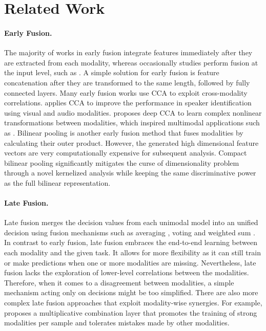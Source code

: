 \documentclass[10pt,twocolumn,letterpaper]{article}
\begin{document}
\section{Related Work}
\paragraph{Early Fusion.}
The majority of works in early fusion integrate features immediately after they are extracted from each modality, whereas occasionally studies perform fusion at the input level, such as \cite{Morales2016DeepCA}. A simple solution for early fusion is feature concatenation after they are transformed to the same length, followed by fully connected layers. Many early fusion works use CCA to exploit cross-modality correlations. \cite{sargin2006multimodal} applies CCA to improve the performance in speaker identification using visual and audio modalities. \cite{andrew2013deep} proposes deep CCA to learn complex nonlinear transformations between modalities, which inspired multimodal applications such as \cite{liu2019multimodal}. Bilinear pooling is another early fusion method that fuses modalities by calculating their outer product. However, the generated high dimensional feature vectors are very computationally expensive for subsequent analysis. Compact bilinear pooling \cite{gao2016compact} significantly mitigates the curse of dimensionality problem \cite{hu2019dense} through a novel kernelized analysis while keeping the same discriminative power as the full bilinear representation. 

\paragraph{Late Fusion.}
Late fusion merges the decision values from each unimodal model into an unified decision using fusion mechanisms such as averaging \cite{shutova-etal-2016-black}, voting \cite{morvant2014majority} and weighted sum \cite{vora2014improved}. In contrast to early fusion, late fusion embraces the end-to-end learning between each modality and the given task. It allows for more flexibility as it can still train or make predictions when one or more modalities are missing. Nevertheless, late fusion lacks the exploration of lower-level correlations between the modalities. Therefore, when it comes to a disagreement between modalities, a simple mechanism acting only on decisions might be too simplified. There are also more complex late fusion approaches that exploit modality-wise synergies. For example, \cite{liu2018learn} proposes a multiplicative combination layer that promotes the training of strong modalities per sample and tolerates mistakes made by other modalities. 
\end{document}
